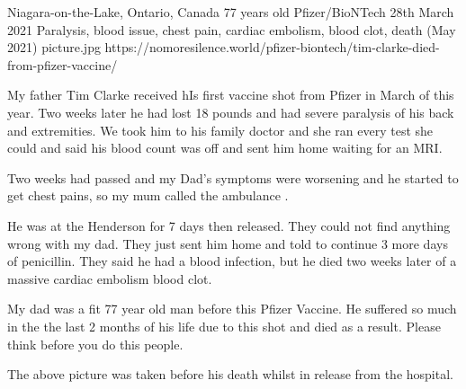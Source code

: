 {Niagara-on-the-Lake, Ontario, Canada}
{77 years old}
{Pfizer/BioNTech}
{28th March 2021}
{Paralysis, blood issue, chest pain, cardiac embolism,  blood clot, death (May 2021)}
{picture.jpg}
{https://nomoresilence.world/pfizer-biontech/tim-clarke-died-from-pfizer-vaccine/}
{

My father Tim Clarke received hIs first vaccine shot from Pfizer in March of
this year. Two weeks later he had lost 18 pounds and had severe paralysis of his
back and extremities. We took him to his family doctor and she ran every test
she could and said his blood count was off and sent him home waiting for an MRI.

Two weeks had passed and my Dad’s symptoms were worsening and he started to get
chest pains, so my mum called the ambulance .

He was at the Henderson for 7 days then released. They could not find anything
wrong with my dad. They just sent him home and told to continue 3 more days of
penicillin. They said he had a blood infection, but he died two weeks later of a
massive cardiac embolism blood clot.

My dad was a fit 77 year old man before this Pfizer Vaccine. He suffered so much
in the the last 2 months of his life due to this shot and died as a
result. Please think before you do this people.

The above picture was taken before his death whilst in release from the
hospital.

}
